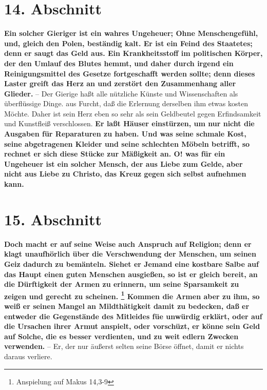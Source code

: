 \section{14. Abschnitt} \label{kap13_ab14} 

\textbf{Ein solcher Gieriger ist ein wahres Ungeheuer; Ohne Menschengefühl, und, gleich
den Polen, beständig kalt. Er ist ein Feind des Staatetes; denn er saugt das
Geld aus. Ein Krankheitsstoff im politischen Körper, der den Umlauf des Blutes
hemmt, und daher durch irgend ein Reinigungsmittel des Gesetze fortgeschafft
werden sollte; denn dieses Laster greift das Herz an und zerstört den
Zusammenhang aller Glieder.} -- Der Gierige haßt alle nützliche Künste und
Wissenschaften als überflüssige Dinge. aus Furcht, daß die Erlernung derselben
ihm etwas kosten Möchte. Daher ist sein Herz eben so sehr als sein Geldbeutel
gegen Erfindsamkeit und Kunstfleiß verschlossen. \textbf{Er laßt Häuser einstürzen, um
nur nicht die Ausgaben für Reparaturen zu haben. Und was seine schmale Kost,
seine abgetragenen Kleider und seine schlechten Möbeln betrifft, so rechnet er
sich diese Stücke zur Mäßigkeit an. O! was für ein Ungeheuer ist ein solcher
Mensch, der aus Liebe zum Gelde, aber nicht aus Liebe zu Christo, das Kreuz
gegen sich selbst aufnehmen kann.}

\section{15. Abschnitt} \label{kap13_ab15} 

\textbf{Doch macht er auf seine Weise auch Anspruch auf Religion; denn er klagt
unaufhörlich über die Verschwendung der Menschen, um seinen Geiz dadurch zu
bemänteln. Siehet er Jemand eine kostbare Salbe auf das Haupt einen guten
Menschen ausgießen, so ist er gleich bereit, an die Dürftigkeit der Armen zu
erinnern, um seine Sparsamkeit zu zeigen und gerecht zu scheinen.
\footnote{Anspielung auf Makus 14,3-9}
Kommen die
Armen aber zu ihm, so weiß er seinen Mangel an Mildthätigkeit damit zu bedecken,
daß er entweder die Gegenstände des Mitleides füe unwürdig erklärt, oder auf die
Ursachen ihrer Armut anspielt, oder vorschüzt, er könne sein Geld auf Solche,
die es besser verdienten, und zu weit edlern Zwecken verwenden.} -- Er, der nur
äußerst selten seine Börse öffnet, damit er nichts daraus verliere.

